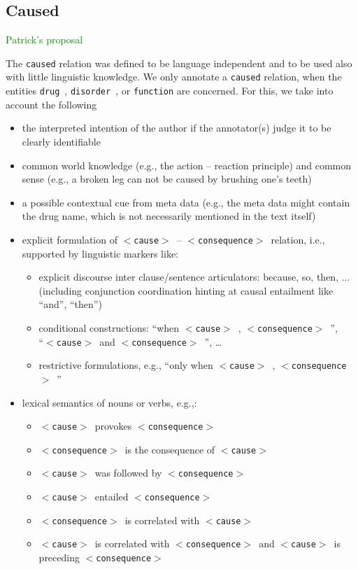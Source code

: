 \documentclass[12pt]{article}
\theoremstyle{definition}
\newcommand{\dis}{\texttt{disorder}\ }
\newcommand{\dr}{\texttt{drug}\ }
\newcommand{\cause}{$<$\texttt{cause}$>$\ }
\newcommand{\conseq}{$<$\texttt{consequence}$>$\ }
\begin{document}
\subsection{Caused}\label{rel_caused}

\textcolor{green}{Patrick's proposal}

The \texttt{caused} relation was defined to be language independent and to be used also with little linguistic knowledge.
We only annotate a \texttt{caused} relation, when the entities \dr, \dis, or \texttt{function} are concerned. 
For this, we take into account the following
\begin{itemize}
    \item the interpreted intention of the author if the annotator(s) judge it to be clearly identifiable
    \item common world knowledge (e.g., the action -- reaction principle) and common sense (e.g., a broken leg can not be caused by brushing one's teeth)
    \item a possible contextual cue from meta data (e.g., the meta data might contain the drug name, which is not necessarily mentioned in the text itself)
    \item explicit formulation of \cause-- \conseq relation, i.e., supported by linguistic markers like:
    \begin{itemize}
        \item explicit discourse inter clause/sentence articulators: because, so, then, ... (including conjunction coordination hinting at  causal entailment like ``and'', ``then'') %
        \item conditional constructions: ``when \cause , \conseq'',  \\ ``\cause and \conseq'', \ldots
        \item restrictive formulations, e.g., ``only when \cause , \conseq''
    \end{itemize}
    \item lexical semantics of nouns or verbs, e.g.,:
    \begin{itemize}
        \item \cause  provokes \conseq
        \item \conseq is the consequence of \cause
        \item \cause was followed by \conseq
        \item \cause entailed \conseq
        \item \conseq is correlated with \cause
        \item \cause is correlated with \conseq and \cause is preceding \conseq

\end{itemize}
\end{itemize}
\end{document}

